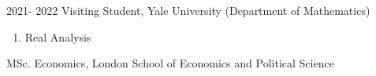 \datedsubsection{ }
	{%
		2021- 2022}
	{%
		Visiting Student, Yale University (Department of Mathematics)}
	{%
    \begin{enumerate}
    \item Real Analysis 
     \end{enumerate}
  }

\datedsubsection{ }
		{%
			}
		{%
			MSc. Economics, London School of Economics and Political Science}
	
